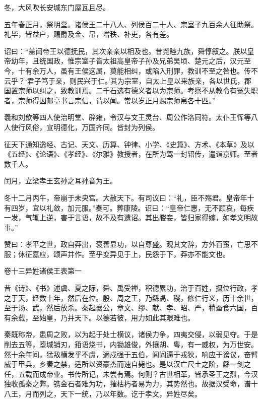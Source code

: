 \documentclass[12pt,UTF8]{ctexbook}
\begin{document}
冬，大风吹长安城东门屋瓦且尽。



五年春正月，祭明堂。诸侯王二十八人、列侯百二十人、宗室子九百余人征助祭。礼毕，皆益户，赐爵及金、帛，增秩、补吏，各有差。



诏曰：“盖闻帝王以德抚民，其次亲亲以相及也。昔尧睦九族，舜惇叙之。朕以皇帝幼年，且统国政，惟宗室子皆太祖高皇帝子孙及兄弟吴顷、楚元之后，汉元至今，十有余万人，虽有王侯这属，莫能相纠，或陷入刑罪，教训不至之咎也。传不云乎？‘君子笃于亲，则民兴于仁。’其为宗室，自太上皇以来族亲，各以世氏，郡国置宗师以纠之，致教训焉。二千石选有德义者以为宗师。考察不从教令有冤失职者，宗师得因邮亭书言宗信，请以闻。常以岁正月赐宗师帛各十匹。”



羲和刘歆等四人使治明堂、辟雍，令汉与文王灵台、周公作洛同符。太仆王恽等八人使行风俗，宣明德化，万国齐同。皆封为列侯。



征天下通知逸经、古记、天文、历算、钟律、小学、《史篇》、方术、《本草》及以《五经》、《论语》、《孝经》、《尔雅》教授者，在所为驾一封轺传，遣诣京师。至者数千人。



闰月，立梁孝王玄孙之耳孙音为王。



冬十二月丙午，帝崩于未央宫。大赦天下。有司议曰：“礼，臣不殇君。皇帝年十有四岁，宜以礼敛，加元服。”奏可。葬康陵。诏曰：“皇帝仁惠，无不顾哀，每疾一发，气辄上逆，害于言语，故不及有遗诏。其出媵妾，皆归家得嫁，如孝文明故事。”



赞曰：孝平之世，政自莽出，褒善显功，以自尊盛。观其文辞，方外百蛮，亡思不服；休征嘉应，颂声并作。至乎变异见于上，民怨于下，莽亦不能文也。





卷十三异姓诸侯王表第一



昔《诗》、《书》述虞、夏之际，舜、禹受禅，积德累功，治于百姓，摄位行政，孝之于天，经数十年，然后在位。殷、周之王，乃繇卨、稷，修仁行义，历十余世，至于汤、武，然后放杀。秦起襄公，章文、缪、献、孝、昭、严，稍蚕食六国，百有余载，至始皇，乃并天下。以德若彼，用力如此其艰难也。



秦既称帝，患周之败，以为起于处士横议，诸侯力争，四夷交侵，以弱见夺。于是削去五等，堕城销刃，箝语烧书，内锄雄俊，外攘胡、粤，有一威权，为万世安。然十余年间，猛敌横发乎不虞，適戍强于五伯，闾阎逼于戎狄，响应于谤议，奋臂威于甲兵，乡秦之禁，适所以资豪杰而速自毙也。是以汉亡尺土之阶，繇一剑之任，五载而成帝业。书传所记，未尝有焉。何则？古世相革，皆承圣王之烈，今汉独收孤秦之弊。镌金石者难为功，摧枯朽者易为力，其势然也。故据汉受命，谱十八王，月而列之，天下一统，乃以年数。讫于孝文，异姓尽矣。
\end{document}
